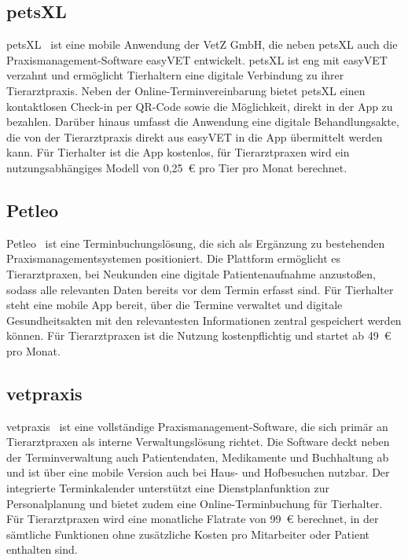 \subsection{petsXL}
petsXL~\cite{petsxl-info} ist eine mobile Anwendung der VetZ GmbH, die neben petsXL auch die Praxismanagement-Software easyVET entwickelt. petsXL ist eng mit easyVET verzahnt und ermöglicht Tierhaltern eine digitale Verbindung zu ihrer Tierarztpraxis. Neben der Online-Terminvereinbarung bietet petsXL einen kontaktlosen Check-in per QR-Code sowie die Möglichkeit, direkt in der App zu bezahlen. Darüber hinaus umfasst die Anwendung eine digitale Behandlungsakte, die von der Tierarztpraxis direkt aus easyVET in die App übermittelt werden kann. Für Tierhalter ist die App kostenlos, für Tierarztpraxen wird ein nutzungsabhängiges Modell von 0,25~€ pro Tier pro Monat berechnet.

\subsection{Petleo}
Petleo~\cite{petleo-info} ist eine Terminbuchungslösung, die sich als Ergänzung zu bestehenden Praxismanagementsystemen positioniert. Die Plattform ermöglicht es Tierarztpraxen, bei Neukunden eine digitale Patientenaufnahme anzustoßen, sodass alle relevanten Daten bereits vor dem Termin erfasst sind. Für Tierhalter steht eine mobile App bereit, über die Termine verwaltet und digitale Gesundheitsakten mit den relevantesten Informationen zentral gespeichert werden können. Für Tierarztpraxen ist die Nutzung kostenpflichtig und startet ab 49~€ pro Monat.

\subsection{vetpraxis}
vetpraxis~\cite{vetpraxis-info} ist eine vollständige
Praxismanagement-Software, die sich primär an Tierarztpraxen als interne Verwaltungslösung richtet. Die Software deckt neben der Terminverwaltung auch Patientendaten, Medikamente und Buchhaltung ab
und ist über eine mobile Version auch bei Haus- und Hofbesuchen nutzbar. Der integrierte Terminkalender unterstützt eine Dienstplanfunktion zur Personalplanung und bietet zudem eine Online-Terminbuchung für Tierhalter. Für Tierarztpraxen wird eine
monatliche Flatrate von 99~€ berechnet, in der sämtliche Funktionen ohne zusätzliche Kosten pro Mitarbeiter oder Patient enthalten
sind.


